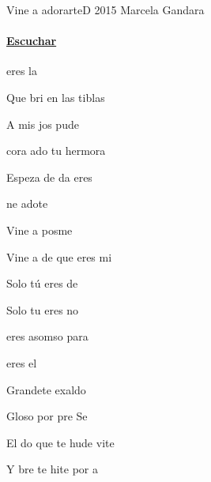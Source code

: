 \documentclass[12pt, spanish]{book}
\begin{document}
    \begin{song}{Vine a adorarte}{D}
        {2015} %
        {Marcela Gandara}
        {} %
        {}
        \ifChordBk

        \paragraph{\mbox{}\hfill\protect\href{https://open.spotify.com/intl-es/track/4DRrtp789xBrpRma3nifFg}{Escuchar}\mbox{}\hfill}
        \fi



        \begin{SBOpGroup}
              eres la  

            Que bri en las tiblas

            A mis jos pude 

             cora ado tu hermora

            Espeza de da eres 
        \end{SBOpGroup}

        \begin{SBChorus}
            ne adote

            Vine a posme

            Vine a de que eres mi 

            Solo tú eres de

            Solo tu eres no

            eres asomso para 
        \end{SBChorus}

        \begin{SBOpGroup}
             eres el 

            Grandete exaldo

            Gloso por pre Se

            El do que te hude vite

            Y bre te hite por a
        \end{SBOpGroup}


\end{song}
\end{document}

